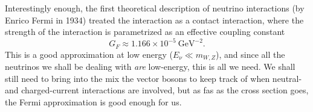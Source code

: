 \begin{marginfigure}
\caption{Feynman diagram for the nuclear beta-type transition~\eqref{eq:nu_nuclear_transition}.
  The layout of the diagram is horizontal: the initial states are on the left and
  the final states are on the right. Purists will notice that the proton and the
  neutron are not fundamental particles, and we should really have three fermion lines
  with two spectator quarks and a $d \rightarrow u$ in the bottom vertex.}
  \label{fig:nu_feynman}
\end{marginfigure}

Interestingly enough, the first theoretical description of neutrino interactions (by
Enrico Fermi in 1934) treated the interaction as a contact interaction, where the
strength of the interaction is parametrized as an effective coupling constant
$$
  G_F \approx 1.166 \times 10^{-5}~\text{GeV}^{-2}.
$$
This is a good approximation at low energy ($E_\nu \ll m_{W,Z}$), and since all the
neutrinos we shall be dealing with \emph{are} low-energy, this is all we need. We
shall still need to bring into the mix the vector bosons to keep track of when neutral-
and charged-current interactions are involved, but as fas as the cross section goes,
the Fermi approximation is good enough for us.


